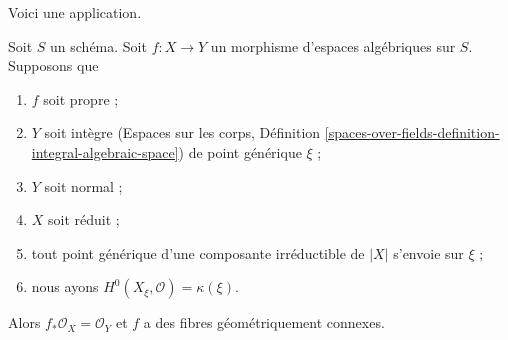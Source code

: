 \noindent
Voici une application.

\begin{lemma}
\label{lemma-geometrically-connected-fibres-towards-normal}
Soit $S$ un schéma. Soit $f : X \to Y$ un morphisme d'espaces
algébriques sur $S$. Supposons que
\begin{enumerate}
\item $f$ soit propre ;
\item $Y$ soit intègre (Espaces sur les corps, Définition
\ref{spaces-over-fields-definition-integral-algebraic-space})
de point générique $\xi$ ;
\item $Y$ soit normal ;
\item $X$ soit réduit ;
\item tout point générique d'une composante irréductible de $|X|$ s'envoie sur $\xi$ ;
\item nous ayons $H^0(X_\xi, \mathcal{O}) = \kappa(\xi)$.
\end{enumerate}
Alors $f_*\mathcal{O}_X = \mathcal{O}_Y$ et $f$
a des fibres géométriquement connexes.
\end{lemma}

